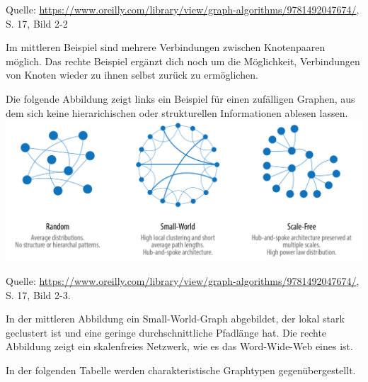 \documentclass[ngerman,]{scrreprt}
\begin{document}
Quelle: \href{Needham/Hodler\%202019}{https://www.oreilly.com/library/view/graph-algorithms/9781492047674/}, S. 17, Bild 2-2

Im mittleren Beispiel sind mehrere Verbindungen zwischen Knotenpaaren möglich. Das rechte Beispiel ergänzt dich noch um die Möglichkeit, Verbindungen von Knoten wieder zu ihnen selbst zurück zu ermöglichen.

Die folgende Abbildung zeigt links ein Beispiel für einen zufälligen Graphen, aus dem sich keine hierarichischen oder strukturellen Informationen ablesen lassen. \includegraphics{Bilder/Graph-Algorithms/17-2-3-RandomSmallWorldScaleFree.png}

Quelle: \href{Needham/Hodler\%202019}{https://www.oreilly.com/library/view/graph-algorithms/9781492047674/}, S. 17, Bild 2-3.

In der mittleren Abbildung ein Small-World-Graph abgebildet, der lokal stark geclustert ist und eine geringe durchschnittliche Pfadlänge hat. Die rechte Abbildung zeigt ein skalenfreies Netzwerk, wie es das Word-Wide-Web eines ist.

In der folgenden Tabelle werden charakteristische Graphtypen gegenübergestellt.
\end{document}
